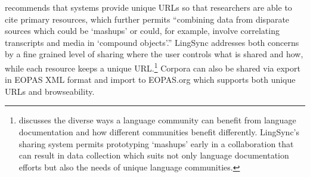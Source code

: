 \documentclass[letterpaper, 12pt, dvips]{mitwpl}
\begin{document}
\cite{Thieberger:2012}  recommends that systems provide unique URLs so that researchers are able to cite primary resources, which further permits ``combining data from disparate sources which could be `mashups' or could, for example, involve correlating transcripts and media in `compound objects'.'' LingSync addresses both concerns by a fine grained level of sharing where the user controls what is shared and how, while each resource keeps a unique URL.\footnote{ \cite{Musgrave:2012} discusses the diverse ways a language community can benefit from language documentation and how different communities benefit differently. LingSync's sharing system permits prototyping `mashups' early in a collaboration that can result in data collection which suits not only language documentation efforts but also the needs of  unique language communities.} 
Corpora can also be shared via export in EOPAS XML format and import to EOPAS.org which supports both unique URLs and browseability. 





%
%
\end{document}
